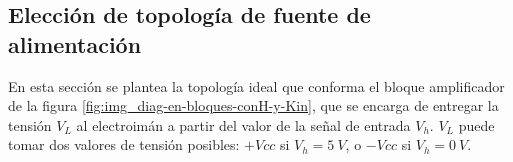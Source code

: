





\subsection{Elección de topología de fuente de alimentación}\label{sec_topologia-fuente-alimentacion}

%
%

En esta sección se plantea la topología ideal que conforma el bloque amplificador de la figura \ref{fig:img_diag-en-bloques-conH-y-Kin}, que se encarga de entregar la tensión $V_L$ al electroimán a partir del valor de la señal de entrada $V_h$. $V_L$ puede tomar dos valores de tensión posibles: $+Vcc$ si $V_h=5\:V$, o $-Vcc$ si $V_h=0\:V$.

